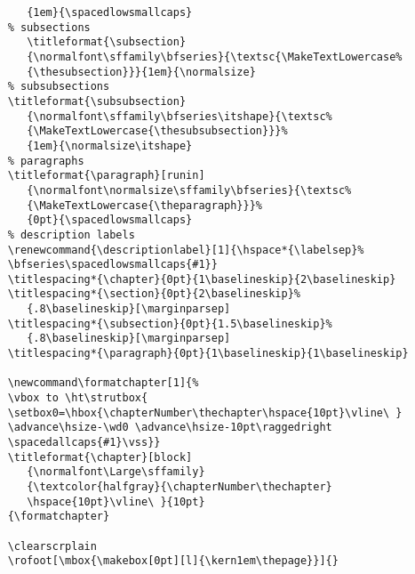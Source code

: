 \begin{lstlisting}
       {1em}{\spacedlowsmallcaps}
    % subsections
       \titleformat{\subsection}
       {\normalfont\sffamily\bfseries}{\textsc{\MakeTextLowercase%
       {\thesubsection}}}{1em}{\normalsize}
    % subsubsections
    \titleformat{\subsubsection}
       {\normalfont\sffamily\bfseries\itshape}{\textsc%
       {\MakeTextLowercase{\thesubsubsection}}}%
       {1em}{\normalsize\itshape}        
    % paragraphs
    \titleformat{\paragraph}[runin]
       {\normalfont\normalsize\sffamily\bfseries}{\textsc%
       {\MakeTextLowercase{\theparagraph}}}%
       {0pt}{\spacedlowsmallcaps}    
    % description labels
    \renewcommand{\descriptionlabel}[1]{\hspace*{\labelsep}%
    \bfseries\spacedlowsmallcaps{#1}}
    \titlespacing*{\chapter}{0pt}{1\baselineskip}{2\baselineskip}
    \titlespacing*{\section}{0pt}{2\baselineskip}%
       {.8\baselineskip}[\marginparsep]
    \titlespacing*{\subsection}{0pt}{1.5\baselineskip}%
       {.8\baselineskip}[\marginparsep]
    \titlespacing*{\paragraph}{0pt}{1\baselineskip}{1\baselineskip}

    \newcommand\formatchapter[1]{% 
    \vbox to \ht\strutbox{ 
    \setbox0=\hbox{\chapterNumber\thechapter\hspace{10pt}\vline\ } 
    \advance\hsize-\wd0 \advance\hsize-10pt\raggedright 
    \spacedallcaps{#1}\vss}} 
    \titleformat{\chapter}[block] 
       {\normalfont\Large\sffamily} 
       {\textcolor{halfgray}{\chapterNumber\thechapter} 
       \hspace{10pt}\vline\ }{10pt} 
    {\formatchapter}    

    \clearscrplain
    \rofoot[\mbox{\makebox[0pt][l]{\kern1em\thepage}}]{}
\end{lstlisting}



